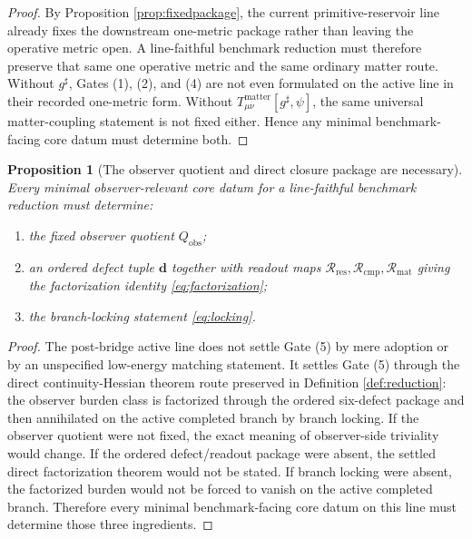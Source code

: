 \documentclass[11pt]{article}
\newcommand{\CompletedMetric}{g^{\sharp}}
\newcommand{\ObserverQuotient}{Q_{\mathrm{obs}}}
\newcommand{\DefectTuple}{\mathbf d}
\newcommand{\ResidualRead}{\mathscr R_{\mathrm{res}}}
\newcommand{\CompletionRead}{\mathscr R_{\mathrm{cmp}}}
\newcommand{\MatterRead}{\mathscr R_{\mathrm{mat}}}
\newtheorem{proposition}{Proposition}
\begin{document}
\begin{proof}
By Proposition \ref{prop:fixedpackage}, the current primitive-reservoir line already fixes the downstream one-metric package rather than leaving the operative metric open. A line-faithful benchmark reduction must therefore preserve that same one operative metric and the same ordinary matter route. Without \(\CompletedMetric\), Gates (1), (2), and (4) are not even formulated on the active line in their recorded one-metric form. Without \(T_{\mu\nu}^{\mathrm{matter}}[\CompletedMetric,\psi]\), the same universal matter-coupling statement is not fixed either. Hence any minimal benchmark-facing core datum must determine both.
\end{proof}

\begin{proposition}[The observer quotient and direct closure package are necessary]
\label{prop:quotient}
Every minimal observer-relevant core datum for a line-faithful benchmark reduction must determine:
\begin{enumerate}
    \item the fixed observer quotient \(\ObserverQuotient\);
    \item an ordered defect tuple \(\DefectTuple\) together with readout maps \(\ResidualRead,\CompletionRead,\MatterRead\) giving the factorization identity \eqref{eq:factorization};
    \item the branch-locking statement \eqref{eq:locking}.
\end{enumerate}
\end{proposition}

\begin{proof}
The post-bridge active line does not settle Gate (5) by mere adoption or by an unspecified low-energy matching statement. It settles Gate (5) through the direct continuity-Hessian theorem route preserved in Definition \ref{def:reduction}: the observer burden class is factorized through the ordered six-defect package and then annihilated on the active completed branch by branch locking. If the observer quotient were not fixed, the exact meaning of observer-side triviality would change. If the ordered defect/readout package were absent, the settled direct factorization theorem would not be stated. If branch locking were absent, the factorized burden would not be forced to vanish on the active completed branch. Therefore every minimal benchmark-facing core datum on this line must determine those three ingredients.
\end{proof}
\end{document}
